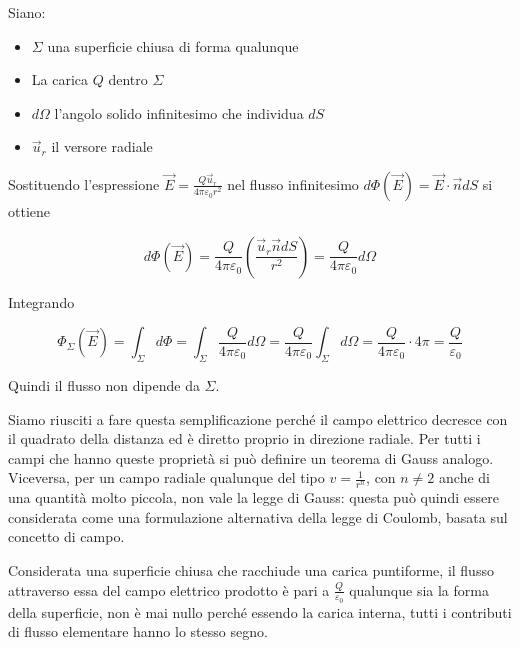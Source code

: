 \begin{figure}[htpb]
\end{figure}
\FloatBarrier

Siano:

\begin{itemize}
	\item $\Sigma$ una superficie chiusa di forma qualunque
	\item La carica $Q$ dentro $\Sigma$
	\item $d\Omega$ l'angolo solido infinitesimo che individua $dS$
	\item $\vec{u}_r$ il versore radiale
\end{itemize}

Sostituendo l'espressione $ \vec{E} =\frac{Q\vec{u}_r}{4\pi \varepsilon_0r^2} $ nel flusso infinitesimo $ d\Phi(\vec{E} ) =\vec{E} \cdot \vec{n} dS$ si ottiene

\[
	d\Phi(\vec{E} )=\frac{Q}{4\pi \varepsilon_0}\left( \frac{\vec{u}_r\vec{n} dS}{r^2} \right)  = \frac{Q}{4\pi \varepsilon_0} d\Omega
\]

Integrando

\[
	\Phi_{\Sigma}(\vec{E} )=\int_{\Sigma}d\Phi=\int_{\Sigma} \frac{Q}{4\pi\varepsilon_0} d\Omega = \frac{Q}{4\pi \varepsilon_0} \int_{\Sigma} d\Omega = \frac{Q}{4\pi \varepsilon_0} \cdot 4\pi = \frac{Q}{\varepsilon_0}
\]

Quindi il flusso non dipende da $\Sigma$.

Siamo riusciti a fare questa semplificazione perché il campo elettrico decresce con il quadrato della distanza ed è diretto proprio in direzione radiale. Per tutti i campi che hanno queste proprietà si può definire un teorema di Gauss analogo. Viceversa, per un campo radiale qualunque del tipo $ v = \frac{1}{r^n} $, con $n\neq 2$ anche di una quantità molto piccola, non vale la legge di Gauss: questa può quindi essere considerata come una formulazione alternativa della legge di Coulomb, basata sul concetto di campo.

Considerata una superficie chiusa che racchiude una carica puntiforme, il flusso attraverso essa del campo elettrico prodotto è pari a $ \frac{Q}{\varepsilon_0} $ qualunque sia la forma della superficie, non è mai nullo perché essendo la carica interna, tutti i contributi di flusso elementare hanno lo stesso segno.

